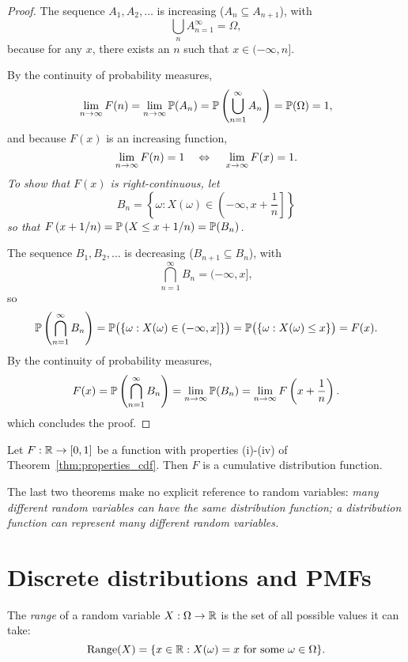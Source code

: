 \begin{proof}
The sequence $A_1,A_2,\ldots$ is increasing ($A_n\subseteq A_{n+1}$), with 
\[
\bigcup_n A_{n=1}^{\infty} = \Omega,
\]
 because for any $x$, there exists an $n$ such that $x\in (-\infty,n]$. 
 \par
 By the continuity of probability measures,
\[
\lim_{n\to\infty}F(n) = \lim_{n\to\infty}\mathbb{P}(A_n) = \mathbb{P}\left(\bigcup_{n=1}^{\infty} A_n\right) = \mathbb{P}(\Omega) = 1,
\]
and because $F(x)$ is an increasing function,
\[
\lim_{n\to\infty}F(n)=1 \text{\quad} \Leftrightarrow \text{\quad} \lim_{x\to\infty}F(x)=1.
\]
\it %
To show that $F(x)$ is right-continuous, let
\[
B_n=\left\{\omega: X(\omega)\in\left(-\infty,x+\frac{1}{n}\right]\right\}
\]
so that $F\left(x+1/n\right) = \mathbb{P}\left(X\leq x+1/n\right) = \mathbb{P}(B_n)$.

The sequence $B_1,B_2,\ldots$ is decreasing ($B_{n+1}\subseteq B_n$), with 
\[
\bigcap_{n=1}^{\infty} B_n=(-\infty,x],
\]
so
\[
\mathbb{P}\left(\bigcap_{n=1}^\infty B_n\right) 
	= \mathbb{P}\big(\{\omega: X(\omega)\in (-\infty,x]\}\big) 
	= \mathbb{P}\big(\{\omega: X(\omega)\leq x\}\big) 
	= F(x).
\]
By the continuity of probability measures,
\[
F(x) = \mathbb{P}\left(\bigcap_{n=1}^{\infty} B_n\right) = \lim_{n\to\infty} \mathbb{P}(B_n) = \lim_{n\to\infty}F\left(x+\frac{1}{n}\right).
\]
which concludes the proof.
\een
\end{proof}

\begin{theorem}\label{thm:characterization_cdf}
Let $F:\mathbb{R}\to[0,1]$ be a function with properties (i)-(iv) of Theorem~\ref{thm:properties_cdf}. Then $F$ is a cumulative distribution function.
\end{theorem}
\proofomitted

\begin{remark}
The last two theorems make no explicit reference to random variables:
\bit
\it many different random variables can have the same distribution function;
\it a distribution function can represent many different random variables.
\eit
\end{remark}




\section{Discrete distributions and PMFs}
The \emph{range} of a random variable $X:\Omega\to\mathbb{R}$ is the set of all possible values it can take: 
\[
\text{Range}(X) = \{x\in\mathbb{R} : X(\omega)=x \text{ for some } \omega\in\Omega\}.
\]

